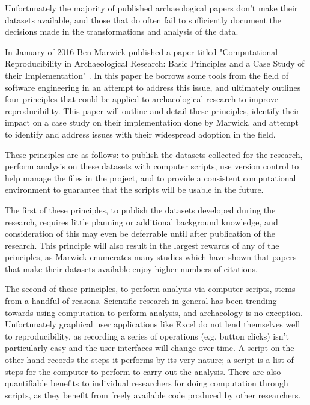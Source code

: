 \documentclass[12pt]{article}
\begin{document}
Unfortunately the majority of published archaeological papers don't make their
datasets available, and those that do often fail to sufficiently document the
decisions made in the transformations and analysis of the data.

In January of 2016 Ben Marwick published a paper titled "Computational
Reproducibility in Archaeological Research: Basic Principles and a Case Study
of their Implementation" \cite{marwick16}. In this paper he borrows some tools
from the field of software engineering in an attempt to address this issue, and
ultimately outlines four principles that could be applied to archaeological
research to improve reproducibility. This paper will outline and detail these
principles, identify their impact on a case study on their implementation done
by Marwick, and attempt to identify and address issues with their widespread
adoption in the field.

These principles are as follows: to publish the datasets collected for the
research, perform analysis on these datasets with computer scripts, use version
control to help manage the files in the project, and to provide a consistent
computational environment to guarantee that the scripts will be usable in the
future.

The first of these principles, to publish the datasets developed during the
research, requires little planning or additional background knowledge, and
consideration of this may even be deferrable until after publication of the
research. This principle will also result in the largest rewards of any of the
principles, as Marwick enumerates many studies which have shown that papers
that make their datasets available enjoy higher numbers of citations.

The second of these principles, to perform analysis via computer scripts, stems
from a handful of reasons. Scientific research in general has been trending
towards using computation to perform analysis, and archaeology is no exception.
Unfortunately graphical user applications like Excel do not lend themselves
well to reproducibility, as recording a series of operations (e.g. button
clicks) isn't particularly easy and the user interfaces will change over time.
A script on the other hand records the steps it performs by its very nature; a
script is a list of steps for the computer to perform to carry out the
analysis. There are also quantifiable benefits to individual researchers for
doing computation through scripts, as they benefit from freely available code
produced by other researchers.
\end{document}
